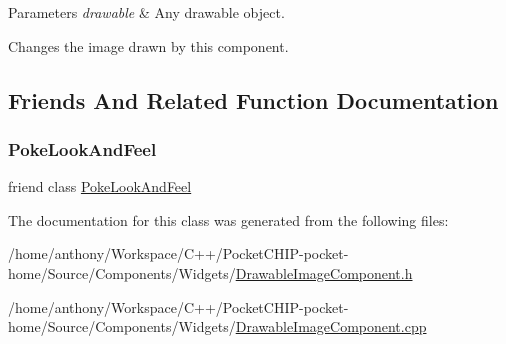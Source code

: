 \begin{DoxyParams}{Parameters}
{\em drawable} & Any drawable object.\\
\hline
\end{DoxyParams}
Changes the image drawn by this component. 

\subsection{Friends And Related Function Documentation}
\mbox{\label{classDrawableImageComponent_a434f7666c5d75bbef0c6cfbdc04d95fb}} 
\subsubsection{\texorpdfstring{Poke\+Look\+And\+Feel}{PokeLookAndFeel}}
{\footnotesize\ttfamily friend class \mbox{\hyperlink{classPokeLookAndFeel}{Poke\+Look\+And\+Feel}}\hspace{0.3cm}{\ttfamily [friend]}}



The documentation for this class was generated from the following files\+:\begin{DoxyCompactItemize}
\item 
/home/anthony/\+Workspace/\+C++/\+Pocket\+C\+H\+I\+P-\/pocket-\/home/\+Source/\+Components/\+Widgets/\mbox{\hyperlink{DrawableImageComponent_8h}{Drawable\+Image\+Component.\+h}}\item 
/home/anthony/\+Workspace/\+C++/\+Pocket\+C\+H\+I\+P-\/pocket-\/home/\+Source/\+Components/\+Widgets/\mbox{\hyperlink{DrawableImageComponent_8cpp}{Drawable\+Image\+Component.\+cpp}}\end{DoxyCompactItemize}
